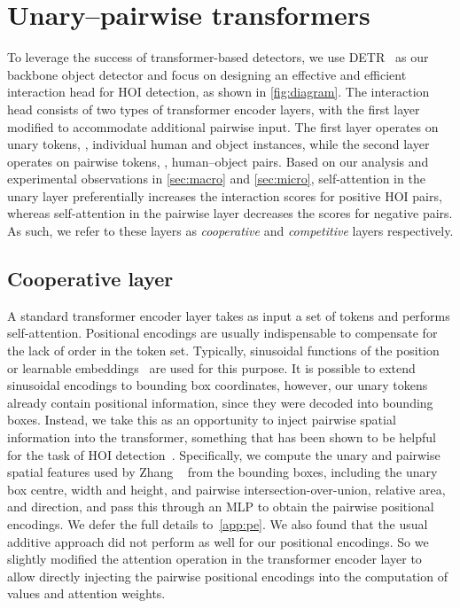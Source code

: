 \documentclass[10pt,twocolumn,letterpaper]{article}
\begin{document}
\section{Unary--pairwise transformers}

To leverage the success of transformer-based detectors, we use DETR~\cite{detr} as our backbone object detector and focus on designing an effective and efficient interaction head for HOI detection, as shown in \cref{fig:diagram}. The interaction head consists of two types of transformer encoder layers, with the first layer modified to accommodate additional pairwise input. The first layer operates on unary tokens, \ie, individual human and object instances, while the second layer operates on pairwise tokens, \ie, human--object pairs. Based on our analysis and experimental observations in \cref{sec:macro} and \cref{sec:micro}, self-attention in the unary layer preferentially increases the interaction scores for positive HOI pairs, whereas self-attention in the pairwise layer decreases the scores for negative pairs. As such, we refer to these layers as \textit{cooperative} and \textit{competitive} layers respectively.

\subsection{Cooperative layer}
\label{sec:coop}

A standard transformer encoder layer takes as input a set of tokens and performs self-attention. Positional encodings are usually indispensable to compensate for the lack of order in the token set. Typically, sinusoidal functions of the position~\cite{xfmer} or learnable embeddings~\cite{detr} are used for this purpose. It is possible to extend sinusoidal encodings to bounding box coordinates, however, our unary tokens already contain positional information, since they were decoded into bounding boxes. Instead, we take this as an opportunity to inject pairwise spatial information into the transformer, something that has been shown to be helpful for the task of HOI detection~\cite{scg}. Specifically, we compute the unary and pairwise spatial features used by Zhang \etal~\cite{scg} from the bounding boxes, including the unary box centre, width and height, and pairwise intersection-over-union, relative area, and direction, and pass this through an MLP to obtain the pairwise positional encodings. We defer the full details to~\cref{app:pe}.
We also found that the usual additive approach did not perform as well for our positional encodings. So we slightly modified the attention operation in the transformer encoder layer to allow directly injecting the pairwise positional encodings into the computation of values and attention weights.
\end{document}
